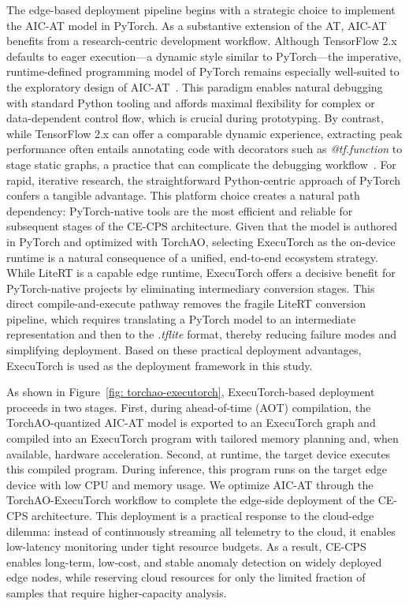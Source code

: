 \documentclass[pdflatex,sn-mathphys-num]{sn-jnl}%
\theoremstyle{thmstyleone}
\theoremstyle{thmstyletwo}%
\theoremstyle{thmstylethree}%
\begin{document}
The edge-based deployment pipeline begins with a strategic choice to implement the AIC-AT model in PyTorch. As a substantive extension of the AT, AIC-AT benefits from a research-centric development workflow. Although TensorFlow 2.x defaults to eager execution---a dynamic style similar to PyTorch---the imperative, runtime-defined programming model of PyTorch remains especially well-suited to the exploratory design of AIC-AT~\cite{alawi2025comparative}. This paradigm enables natural debugging with standard Python tooling and affords maximal flexibility for complex or data-dependent control flow, which is crucial during prototyping. By contrast, while TensorFlow 2.x can offer a comparable dynamic experience, extracting peak performance often entails annotating code with decorators such as \textit{@tf.function} to stage static graphs, a practice that can complicate the debugging workflow~\cite{liu2021detecting,galeone2019hands}. For rapid, iterative research, the straightforward Python-centric approach of PyTorch confers a tangible advantage. This platform choice creates a natural path dependency: PyTorch-native tools are the most efficient and reliable for subsequent stages of the CE-CPS architecture. Given that the model is authored in PyTorch and optimized with TorchAO, selecting ExecuTorch as the on-device runtime is a natural consequence of a unified, end-to-end ecosystem strategy. While LiteRT is a capable edge runtime, ExecuTorch offers a decisive benefit for PyTorch-native projects by eliminating intermediary conversion stages. This direct compile-and-execute pathway removes the fragile LiteRT conversion pipeline, which requires translating a PyTorch model to an intermediate representation and then to the \textit{.tflite} format, thereby reducing failure modes and simplifying deployment. Based on these practical deployment advantages, ExecuTorch is used as the deployment framework in this study.

As shown in Figure~\ref{fig: torchao-executorch}, ExecuTorch-based deployment proceeds in two stages. First, during ahead-of-time (AOT) compilation, the TorchAO-quantized AIC-AT model is exported to an ExecuTorch graph and compiled into an ExecuTorch program with tailored memory planning and, when available, hardware acceleration. Second, at runtime, the target device executes this compiled program. During inference, this program runs on the target edge device with low CPU and memory usage.
We optimize AIC-AT through the TorchAO-ExecuTorch workflow to complete the edge-side deployment of the CE-CPS architecture. This deployment is a practical response to the cloud-edge dilemma: instead of continuously streaming all telemetry to the cloud, it enables low-latency monitoring under tight resource budgets. As a result, CE-CPS enables long-term, low-cost, and stable anomaly detection on widely deployed edge nodes, while reserving cloud resources for only the limited fraction of samples that require higher-capacity analysis.
\end{document}
